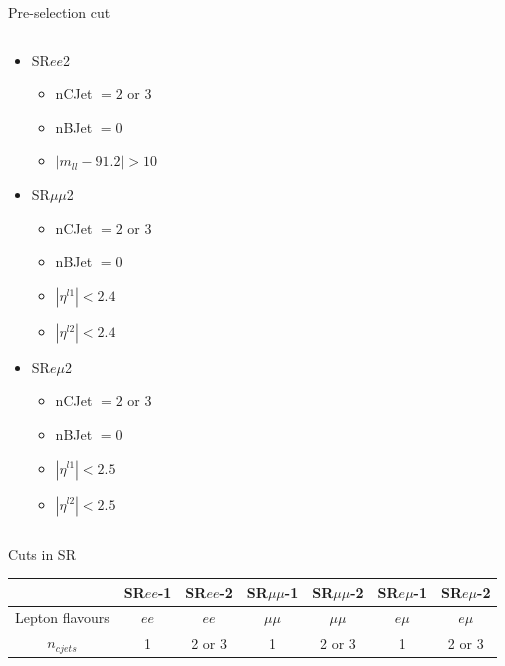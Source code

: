 \documentclass[mathserif,serif]{beamer}
\begin{document}
\begin{frame}{Pre-selection cut}
\begin{columns}
\begin{column}{0.5\textwidth}
\begin{itemize}
\item SR$ee$2
\begin{itemize}
\item nCJet $=2$ or $3$
\item nBJet $=0$
\item $|m_{ll} - 91.2| > 10$
\end{itemize}
\item SR$\mu\mu$2
\begin{itemize}
\item nCJet $=2$ or $3$
\item nBJet $=0$
\item $|\eta^{l1}| < 2.4$
\item $|\eta^{l2}| < 2.4$
\end{itemize}
\item SR$e\mu$2
\begin{itemize}
\item nCJet $=2$ or $3$
\item nBJet $=0$
\item $|\eta^{l1}| < 2.5$
\item $|\eta^{l2}| < 2.5$
\end{itemize}
\end{itemize}

\end{column}
\end{columns}
\end{frame}

\begin{frame}{Cuts in SR}
\vspace{5mm}
\tiny
\begin{tabular}{|c|c|c|c|c|c|c|}
\hline
& SR$ee$-1 & SR$ee$-2 & SR$\mu\mu$-1 & SR$\mu\mu$-2 & SR$e\mu$-1 & SR$e\mu$-2 \\
\hline
Lepton flavours & $ee$ & $ee$ & $\mu\mu$ & $\mu\mu$ & $e\mu$ & $e\mu$ \\
\hline
$n_{cjets}$ & 1 & 2 or 3 & 1 & 2 or 3 & 1 & 2 or 3 \\
\hline

\end{tabular}
\end{frame}



\end{document}
